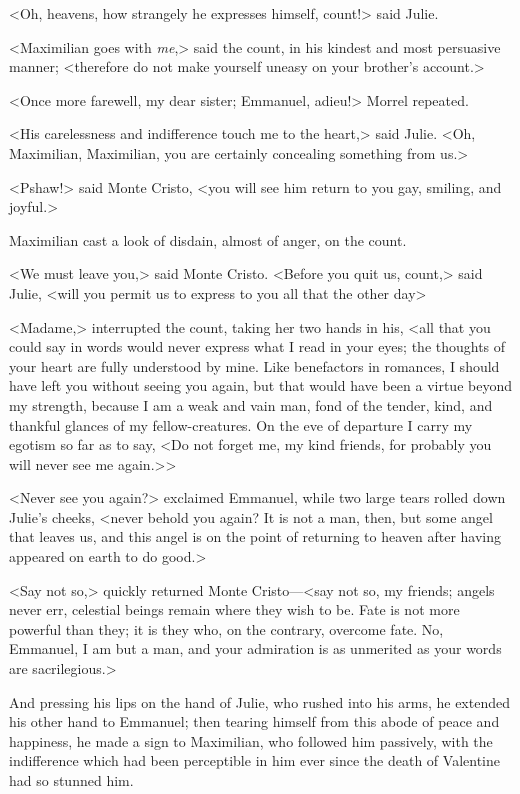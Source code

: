  <Oh, heavens, how strangely he expresses himself, count!> said Julie. 

 <Maximilian goes with \textit{me},> said the count, in his kindest and most persuasive manner; <therefore do not make yourself uneasy on your brother's account.> 

 <Once more farewell, my dear sister; Emmanuel, adieu!> Morrel repeated. 

 <His carelessness and indifference touch me to the heart,> said Julie. <Oh, Maximilian, Maximilian, you are certainly concealing something from us.> 

 <Pshaw!> said Monte Cristo, <you will see him return to you gay, smiling, and joyful.> 

 Maximilian cast a look of disdain, almost of anger, on the count. 

 <We must leave you,> said Monte Cristo.  <Before you quit us, count,> said Julie, <will you permit us to express to you all that the other day\longdash> 

 <Madame,> interrupted the count, taking her two hands in his, <all that you could say in words would never express what I read in your eyes; the thoughts of your heart are fully understood by mine. Like benefactors in romances, I should have left you without seeing you again, but that would have been a virtue beyond my strength, because I am a weak and vain man, fond of the tender, kind, and thankful glances of my fellow-creatures. On the eve of departure I carry my egotism so far as to say, <Do not forget me, my kind friends, for probably you will never see me again.>> 

 <Never see you again?> exclaimed Emmanuel, while two large tears rolled down Julie's cheeks, <never behold you again? It is not a man, then, but some angel that leaves us, and this angel is on the point of returning to heaven after having appeared on earth to do good.> 

 <Say not so,> quickly returned Monte Cristo—<say not so, my friends; angels never err, celestial beings remain where they wish to be. Fate is not more powerful than they; it is they who, on the contrary, overcome fate. No, Emmanuel, I am but a man, and your admiration is as unmerited as your words are sacrilegious.> 

 And pressing his lips on the hand of Julie, who rushed into his arms, he extended his other hand to Emmanuel; then tearing himself from this abode of peace and happiness, he made a sign to Maximilian, who followed him passively, with the indifference which had been perceptible in him ever since the death of Valentine had so stunned him. 

